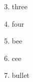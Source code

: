 \documentclass[11pt]{article}
\author{Au}
\date{2026-01-01}
\title{}
\begin{document}
\tableofcontents

\begin{enumerate}
\setcounter{enumi}{2}
\item three
\item four

\setcounter{enumi}{1}
\item bee
\item cee

\setcounter{enumi}{3}
\item bullet
\end{enumerate}
\end{document}
